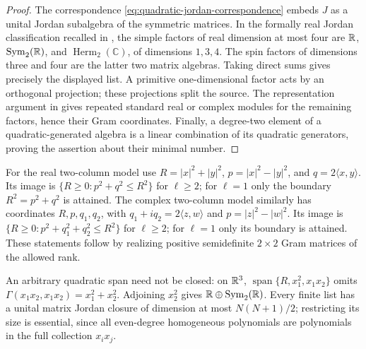 \begin{proof}
The correspondence \eqref{eq:quadratic-jordan-correspondence} embeds
$J$ as a unital Jordan subalgebra of the symmetric matrices. In the
formally real Jordan classification recalled in
\cite[Appendix~A]{MendesRadeschiQuadratic}, the simple factors of
real dimension at most four are $\mathbb R$, $\operatorname{Sym}_2(\mathbb R)$,
and $\operatorname{Herm}_2(\mathbb C)$, of dimensions $1,3,4$.
The spin factors of dimensions three and four are the latter two
matrix algebras. Taking direct sums gives precisely the displayed
list. A primitive one-dimensional factor acts by an orthogonal
projection; these projections split the source. The representation
argument in \cite[Section~3 and Appendix~A]{MendesRadeschiQuadratic}
gives repeated standard real or complex modules for the remaining
factors, hence their Gram coordinates. Finally, a degree-two element
of a quadratic-generated algebra is a linear combination of its
quadratic generators, proving the assertion about their minimal number.
\end{proof}

For the real two-column model use
$R=|x|^2+|y|^2$, $p=|x|^2-|y|^2$, and $q=2\langle x,y\rangle$.
Its image is $\{R\geq0:p^2+q^2\leq R^2\}$ for $\ell\geq2$;
for $\ell=1$ only the boundary $R^2=p^2+q^2$ is attained.
The complex two-column model similarly has coordinates
$R,p,q_1,q_2$, with $q_1+iq_2=2\langle z,w\rangle$ and
$p=|z|^2-|w|^2$. Its image is
$\{R\geq0:p^2+q_1^2+q_2^2\leq R^2\}$ for $\ell\geq2$;
for $\ell=1$ only its boundary is attained. These statements follow by realizing positive
semidefinite $2\times2$ Gram matrices of the allowed rank.

An arbitrary quadratic span need not be closed: on $\mathbb R^3$,
$\operatorname{span}\{R,x_1^2,x_1x_2\}$ omits
$\Gamma(x_1x_2,x_1x_2)=x_1^2+x_2^2$. Adjoining $x_2^2$ gives
$\mathbb R\oplus\operatorname{Sym}_2(\mathbb R)$. Every finite list has a unital
matrix Jordan closure of dimension at most $N(N+1)/2$; restricting
its size is essential, since all even-degree homogeneous polynomials
are polynomials in the full collection $x_ix_j$.

